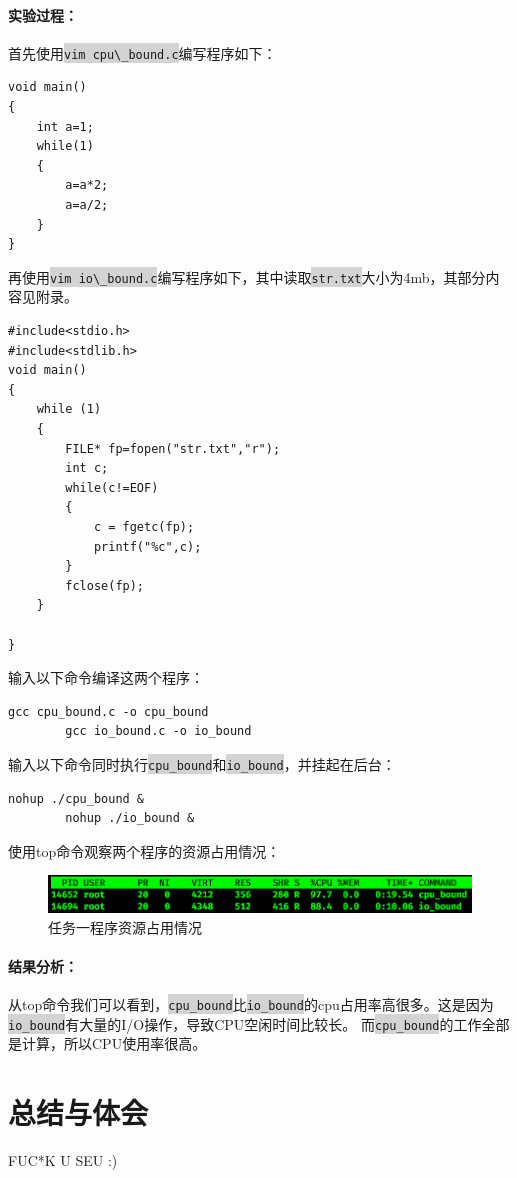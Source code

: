 \documentclass{article}
\newcommand\bash[1]{\colorbox{lightgray}{\lstinline[style=bash]|#1|}}
\begin{document}
    \paragraph{实验过程：}\quad\par
    首先使用\bash{vim cpu\_bound.c}编写程序如下：
    \begin{lstlisting}[style=c]
void main()
{
    int a=1;
    while(1)
    {
        a=a*2;
        a=a/2;
    }
}
    \end{lstlisting}\par
    再使用\bash{vim io\_bound.c}编写程序如下，其中读取\bash{str.txt}大小为4mb，其部分内容见附录。
    \begin{lstlisting}[style=c]
#include<stdio.h>
#include<stdlib.h>
void main()
{
    while (1)
    {
        FILE* fp=fopen("str.txt","r");
        int c;
        while(c!=EOF)
        {
            c = fgetc(fp);
            printf("%c",c);
        }
        fclose(fp);
    }
    
}
    \end{lstlisting}\par
    输入以下命令编译这两个程序：
    \begin{lstlisting}[style=bash]
        gcc cpu_bound.c -o cpu_bound
        gcc io_bound.c -o io_bound
    \end{lstlisting}\par
    输入以下命令同时执行\bash{cpu_bound}和\bash{io_bound}，并挂起在后台：
    \begin{lstlisting}[style=bash]
        nohup ./cpu_bound &
        nohup ./io_bound &
    \end{lstlisting}\par
    使用top命令观察两个程序的资源占用情况：
    \begin{figure}[!h]
        \centering
        \includegraphics[width=\linewidth]{exp1_top.png}
        \caption{任务一程序资源占用情况}
    \end{figure}
    \paragraph{结果分析：}\quad\par
    从top命令我们可以看到，\bash{cpu_bound}比\bash{io_bound}的cpu占用率高很多。这是因为\bash{io_bound}有大量的I/O操作，导致CPU空闲时间比较长。
    而\bash{cpu_bound}的工作全部是计算，所以CPU使用率很高。
    \section{总结与体会}
FUC*K U SEU :)
\end{document}
